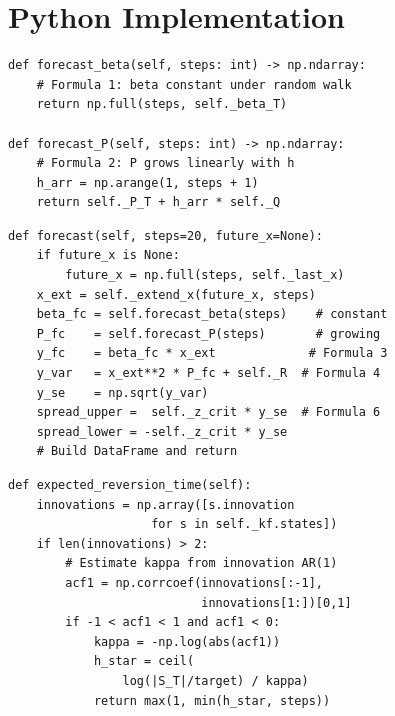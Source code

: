 \documentclass[10pt,a4paper,twocolumn]{article}
\begin{document}
\section{Python Implementation}

\begin{tcolorbox}[codebox={forecast\_beta and forecast\_P}]
\begin{lstlisting}[style=pythonplain]
def forecast_beta(self, steps: int) -> np.ndarray:
    # Formula 1: beta constant under random walk
    return np.full(steps, self._beta_T)

def forecast_P(self, steps: int) -> np.ndarray:
    # Formula 2: P grows linearly with h
    h_arr = np.arange(1, steps + 1)
    return self._P_T + h_arr * self._Q
\end{lstlisting}
\end{tcolorbox}

\begin{tcolorbox}[codebox={forecast() --- main method}]
\begin{lstlisting}[style=pythonplain]
def forecast(self, steps=20, future_x=None):
    if future_x is None:
        future_x = np.full(steps, self._last_x)
    x_ext = self._extend_x(future_x, steps)
    beta_fc = self.forecast_beta(steps)    # constant
    P_fc    = self.forecast_P(steps)       # growing
    y_fc    = beta_fc * x_ext             # Formula 3
    y_var   = x_ext**2 * P_fc + self._R  # Formula 4
    y_se    = np.sqrt(y_var)
    spread_upper =  self._z_crit * y_se  # Formula 6
    spread_lower = -self._z_crit * y_se
    # Build DataFrame and return
\end{lstlisting}
\end{tcolorbox}

\begin{tcolorbox}[codebox={expected\_reversion\_time()}]
\begin{lstlisting}[style=pythonplain]
def expected_reversion_time(self):
    innovations = np.array([s.innovation
                    for s in self._kf.states])
    if len(innovations) > 2:
        # Estimate kappa from innovation AR(1)
        acf1 = np.corrcoef(innovations[:-1],
                           innovations[1:])[0,1]
        if -1 < acf1 < 1 and acf1 < 0:
            kappa = -np.log(abs(acf1))
            h_star = ceil(
                log(|S_T|/target) / kappa)
            return max(1, min(h_star, steps))
\end{lstlisting}
\end{tcolorbox}
\end{document}
